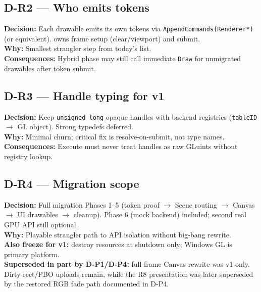 \subsection*{D-R2 --- Who emits tokens}
\begin{decisionbox}[title={D-R2 \quad 2026-07-28}]
\textbf{Decision:} Each drawable emits its own tokens via
\texttt{AppendCommands(Renderer*)} (or equivalent). 
owns frame setup (clear/viewport) and submit.\\
\textbf{Why:} Smallest strangler step from today's
 list.\\
\textbf{Consequences:} Hybrid phase may still call immediate \texttt{Draw}
for unmigrated drawables after token submit.
\end{decisionbox}

\subsection*{D-R3 --- Handle typing for v1}
\begin{decisionbox}[title={D-R3 \quad 2026-07-28}]
\textbf{Decision:} Keep \texttt{unsigned long} opaque handles with backend
registries (\texttt{tableID} $\rightarrow$ GL object). Strong typedefs deferred.\\
\textbf{Why:} Minimal churn; critical fix is resolve-on-submit, not type names.\\
\textbf{Consequences:} Execute must never treat handles as raw GLuints without
registry lookup.
\end{decisionbox}

\subsection*{D-R4 --- Migration scope}
\begin{decisionbox}[title={D-R4 \quad 2026-07-28}]
\textbf{Decision:} Full migration Phases 1--5 (token proof $\rightarrow$ Scene
routing $\rightarrow$ Canvas $\rightarrow$ UI drawables $\rightarrow$ cleanup).
Phase 6 (mock backend) included; second real GPU API still optional.\\
\textbf{Why:} Playable strangler path to API isolation without big-bang rewrite.\\
\textbf{Also freeze for v1:} destroy resources at shutdown only; Windows GL is
primary platform.\\
\textbf{Superseded in part by D-P1/D-P4:} full-frame Canvas rewrite was v1 only.
Dirty-rect/PBO uploads remain, while the R8 presentation was later superseded
by the restored RGB fade path documented in D-P4.
\end{decisionbox}


